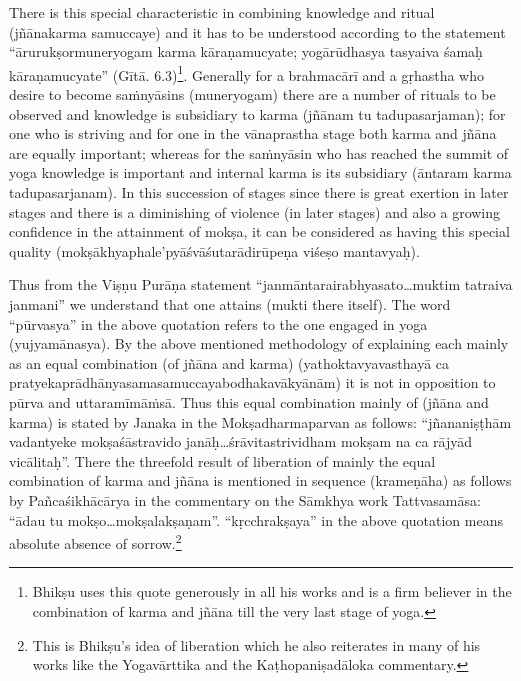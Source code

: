 There is this special characteristic in combining knowledge and ritual (jñānakarma samuccaye) and it has to be understood according to the statement “ārurukṣormuneryogam karma kāraṇamucyate; yogārūdhasya tasyaiva śamaḥ kāraṇamucyate” (Gītā. 6.3)\footnote{Bhikṣu uses this quote generously in all his works and is a firm believer in the combination of karma and jñāna till the very last stage of yoga.}. Generally for a brahmacārī and a gṛhastha who desire to become saṁnyāsins (muneryogam) there are a number of rituals to be observed and knowledge is subsidiary to karma (jñānam tu tadupasarjaman); for one who is striving and for one in the vānaprastha stage both karma and jñāna are equally important; whereas for the saṁnyāsin who has reached the summit of yoga knowledge is important and internal karma is its subsidiary (āntaram karma tadupasarjanam). In this succession of stages since there is great exertion in later stages and there is a diminishing of violence (in later stages) and also a growing confidence in the attainment of mokṣa, it can be considered as having this special quality (mokṣākhyaphale’pyāśvāśutarādirūpeṇa viśeṣo mantavyaḥ).

Thus from the Viṣṇu Purāṇa statement “janmāntarairabhyasato…muk\-tim tatraiva janmani” we understand that one attains (mukti there itself). The word “pūrvasya” in the above quotation refers to the one engaged in yoga (yujyamānasya). By the above mentioned methodology of explaining each mainly as an equal combination (of jñāna and karma) (yathoktavyavasthayā ca pratyekaprādhānyasamasamuccayabodhakavākyānām) it is not in opposition to pūrva and uttaramīmāṁsā. Thus this equal combination mainly of (jñāna and karma) is stated by Janaka in the Mokṣadharmaparvan as follows: “jñananiṣṭhām vadantyeke mokṣaśāstravido janāḥ…śrāvitastrividham mokṣam na ca rājyād vicālitaḥ”. There the threefold result of liberation of mainly the equal combination of karma and jñāna is mentioned in sequence (krameṇāha) as follows by Pañcaśikhācārya in the commentary on the Sāmkhya work Tattvasamāsa: “ādau tu mokṣo…mokṣalakṣaṇam”. “kṛcchrakṣaya” in the above quotation means absolute absence of sorrow.\footnote{This is Bhikṣu’s idea of liberation which he also reiterates in many of his works like the Yogavārttika and the Kaṭhopaniṣadāloka commentary.}  


